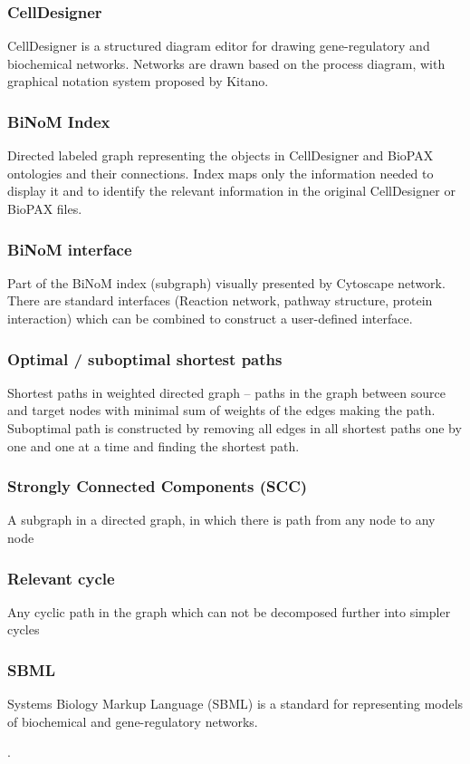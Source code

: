 \subsubsection{CellDesigner}
CellDesigner is a structured diagram editor for drawing gene-regulatory and biochemical networks. Networks are drawn based on the process diagram, with graphical notation system proposed by Kitano.
\subsubsection{BiNoM Index}
Directed labeled graph representing the objects in CellDesigner and BioPAX ontologies and their connections. Index maps only the information needed to display it and to identify the relevant information in the original CellDesigner or BioPAX files.
\subsubsection{BiNoM interface}
Part of the BiNoM index (subgraph) visually presented by Cytoscape network. There are standard interfaces (Reaction network, pathway structure, protein interaction) which can be combined to construct a user-defined interface.
\subsubsection{Optimal / suboptimal shortest paths}
Shortest paths in weighted directed graph – paths in the graph between source and target nodes with minimal sum of weights of the edges making the path. Suboptimal path is constructed by removing all edges in all shortest paths one by one and one at a time and finding the shortest path.
\subsubsection{Strongly Connected Components (SCC)}
A subgraph in a directed graph, in which there is path from any node to any node
\subsubsection{Relevant cycle}
Any cyclic path in the graph which can not be decomposed further into simpler cycles
\subsubsection{SBML}
Systems Biology Markup Language (SBML) is a standard for representing models of biochemical and gene-regulatory networks.


.
